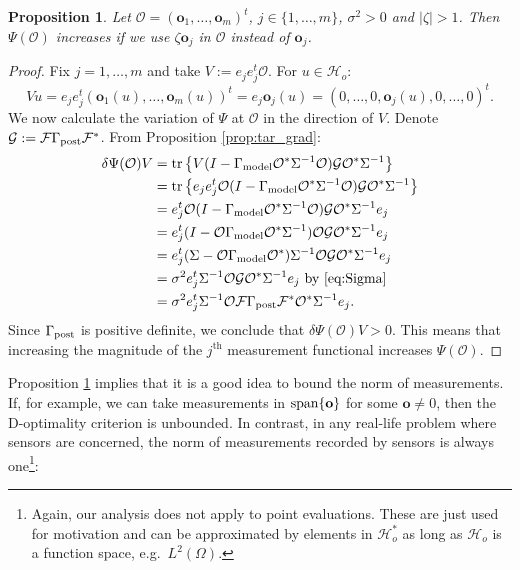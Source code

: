 \documentclass[ba]{imsart}
\newcommand{\hilo}{\mathcal{H}_o}
\newcommand{\obs}{\mathcal{O}}
\newcommand{\fwd}{\mathcal{F}}
\newcommand{\tar}{\Psi}
\newcommand{\meas}{\mathbf{o}}
\newcommand{\tr}[1]{\textup{tr}\left \{#1 \right \} }
\theoremstyle{plain}
\newtheorem{proposition}[theorem]{Proposition}
\theoremstyle{definition}
\theoremstyle{remark}
\begin{document}
\begin{proposition}\label{prop:bigger_better}
  Let $\obs = (\meas_1,\dots,\meas_m)^t$, $j \in \{1,\dots,m\}$,
  $\sigma^2 > 0$ and $|\zeta| > 1$. Then $\tar(\obs)$ increases if we
  use $\zeta \meas_j$ in $\obs$ instead of $\meas_j$.
\end{proposition}

\begin{proof} 
  Fix $j=1,\dots,m$ and take $V:= e_j e_j^t \obs$. For $u
  \in \hilo$:
  \begin{equation*}
    Vu = e_je_j^t (\meas_1(u),\dots,\meas_m(u) )^t = e_j \meas_j(u)
    = (0,\dots,0,\meas_j(u),0,\dots,0)^t.
  \end{equation*}
We now calculate the variation of $\tar$ at $\obs$ in the direction
  of $V$. Denote $\tmp: = \fwd \postcov \fwd^*$. From Proposition
  \ref{prop:tar_grad}:
  \begin{align*}
     \delta \tar(\obs) V 
    &= \tr{V ( I - \modcov \obs^*\Sigma^{-1}\obs) \tmp \obs^* \Sigma^{-1}} \\
&= \tr{e_je_j^t \obs ( I - \modcov \obs^*\Sigma^{-1}\obs) \tmp \obs^* \Sigma^{-1}} \\
&= e_j^t \obs ( I - \modcov \obs^*\Sigma^{-1}\obs) \tmp \obs^* \Sigma^{-1}e_j \\
&= e_j^t ( I - \obs \modcov \obs^*\Sigma^{-1})\obs \tmp \obs^* \Sigma^{-1}e_j \\  
&=  e_j^t(\Sigma-\obs \modcov \obs^*) \Sigma^{-1}\obs \tmp \obs^* \Sigma^{-1}e_j \\
&=\sigma^2 e_j^t \Sigma^{-1}\obs \tmp \obs^* \Sigma^{-1}e_j
    \text{ by \eqref{eq:Sigma} }\\
&=\sigma^2 e_j^t \Sigma^{-1}\obs \fwd \postcov \fwd^* \obs^* \Sigma^{-1}e_j.
  \end{align*} 
  Since $\Gamma_{\textup{post}}$ is positive definite, we conclude that $\delta
  \tar(\obs) V > 0$. This means that increasing the magnitude of the
  $j^{\text{th}}$ measurement functional increases $\tar(\obs)$.
\end{proof}

Proposition \ref{prop:bigger_better} implies that it is a good idea to
bound the norm of measurements. If, for example, we can take
measurements in $\textup{span}\{\meas\}$ for some $\meas \neq 0$, then
the D-optimality criterion is unbounded. In contrast, in any real-life
problem where sensors are concerned, the norm of measurements recorded
by sensors is always one\footnote{Again, our analysis does not apply
to point evaluations. These are just used for motivation and can be
approximated by elements in $\hilo^*$ as long as $\hilo$ is a function
space, e.g.~$L^2(\Omega)$.}:
\end{document}
